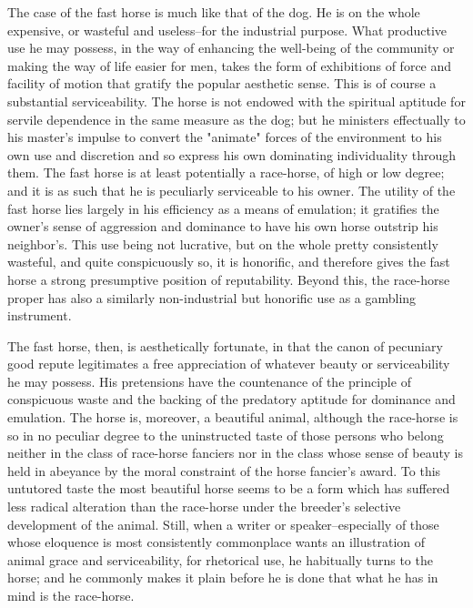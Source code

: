 \documentclass[12pt]{report}
\begin{document}
The case of the fast horse is much like that of the dog. He is on the
whole expensive, or wasteful and useless--for the industrial purpose.
What productive use he may possess, in the way of enhancing the
well-being of the community or making the way of life easier for men,
takes the form of exhibitions of force and facility of motion that
gratify the popular aesthetic sense. This is of course a substantial
serviceability. The horse is not endowed with the spiritual aptitude
for servile dependence in the same measure as the dog; but he ministers
effectually to his master's impulse to convert the "animate" forces of
the environment to his own use and discretion and so express his own
dominating individuality through them. The fast horse is at least
potentially a race-horse, of high or low degree; and it is as such that
he is peculiarly serviceable to his owner. The utility of the fast horse
lies largely in his efficiency as a means of emulation; it gratifies the
owner's sense of aggression and dominance to have his own horse outstrip
his neighbor's. This use being not lucrative, but on the whole pretty
consistently wasteful, and quite conspicuously so, it is honorific,
and therefore gives the fast horse a strong presumptive position of
reputability. Beyond this, the race-horse proper has also a similarly
non-industrial but honorific use as a gambling instrument.

The fast horse, then, is aesthetically fortunate, in that the canon of
pecuniary good repute legitimates a free appreciation of whatever beauty
or serviceability he may possess. His pretensions have the countenance
of the principle of conspicuous waste and the backing of the predatory
aptitude for dominance and emulation. The horse is, moreover, a
beautiful animal, although the race-horse is so in no peculiar degree to
the uninstructed taste of those persons who belong neither in the class
of race-horse fanciers nor in the class whose sense of beauty is held in
abeyance by the moral constraint of the horse fancier's award. To this
untutored taste the most beautiful horse seems to be a form which has
suffered less radical alteration than the race-horse under the
breeder's selective development of the animal. Still, when a writer
or speaker--especially of those whose eloquence is most consistently
commonplace wants an illustration of animal grace and serviceability,
for rhetorical use, he habitually turns to the horse; and he commonly
makes it plain before he is done that what he has in mind is the
race-horse.
\end{document}
